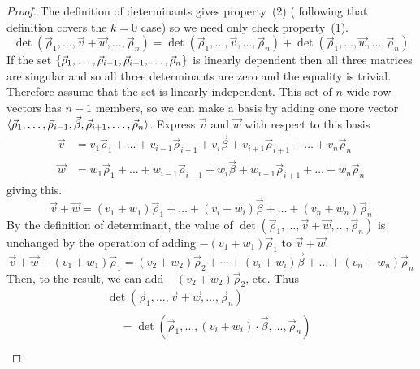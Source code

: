\begin{proof}
The definition of determinants gives property~(2) 
( following that definition
covers the $k=0$ case) so we need only check property~(1).
\begin{equation*}
  \det(\vec{\rho}_1,\dots,\vec{v}+\vec{w},
      \dots,\vec{\rho}_n)
  =\det(\vec{\rho}_1,\dots,\vec{v},\dots,\vec{\rho}_n)
  +\det(\vec{\rho}_1,\dots,\vec{w},\dots,\vec{\rho}_n)
\end{equation*}
If the set 
\( \mbox{$\{\vec{\rho}_1,\dots,\vec{\rho}_{i-1},\vec{\rho}_{i+1},
       \dots,\vec{\rho}_n\}$} \)
is linearly dependent then all three matrices are singular and so all
three determinants are zero and the equality is trivial.
Therefore assume that the set is linearly independent.
This set of $n$-wide row vectors has $n-1$ members, so we can make a basis by 
adding one more vector
$\langle\vec{\rho}_1,\dots,\vec{\rho}_{i-1},\vec{\beta},
               \vec{\rho}_{i+1},\dots,\vec{\rho}_n\rangle$.
Express $\vec{v}$ and $\vec{w}$ with respect to this basis
\begin{align*}
  \vec{v} &=v_1\vec{\rho}_1+\dots+v_{i-1}\vec{\rho}_{i-1}+v_i\vec{\beta}
            +v_{i+1}\vec{\rho}_{i+1}+\dots+v_n\vec{\rho}_n                \\
  \vec{w} &= w_1\vec{\rho}_1+\dots+w_{i-1}\vec{\rho}_{i-1}+w_i\vec{\beta}
            +w_{i+1}\vec{\rho}_{i+1}+\dots+w_n\vec{\rho}_n
\end{align*}
giving this.
\begin{equation*}
  \vec{v}+\vec{w}
  =
  (v_1+w_1)\vec{\rho}_1+\dots+(v_i+w_i)\vec{\beta}
            +\dots+(v_n+w_n)\vec{\rho}_n 
\end{equation*}
By the definition of determinant, the value of 
$\det(\vec{\rho}_1,\dots,\vec{v}+\vec{w},\dots,\vec{\rho}_n)$
is unchanged by the operation of 
adding $-(v_1+w_1)\vec{\rho}_1$ to $\vec{v}+\vec{w}$.
\begin{equation*}
  \vec{v}+\vec{w}-(v_1+w_1)\vec{\rho}_1
  =
  (v_2+w_2)\vec{\rho}_2+\cdots+(v_i+w_i)\vec{\beta}
            +\dots+(v_n+w_n)\vec{\rho}_n 
\end{equation*}
Then, to the result, we can add $-(v_2+w_2)\vec{\rho}_2$, etc.
Thus
\begin{multline*}
  \det (\vec{\rho}_1,\dots,\vec{v}+\vec{w},\dots,\vec{\rho}_n)          \\
  \begin{aligned}
    &=\det (\vec{\rho}_1,\dots,(v_i+w_i)\cdot\vec{\beta},\dots,\vec{\rho}_n) \\

\end{aligned}
\end{multline*}
\end{proof}
